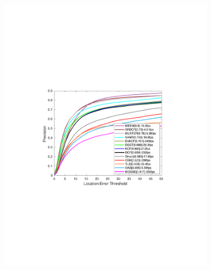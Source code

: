 \documentclass[10pt,twocolumn,letterpaper]{article}
\begin{document}
\begin{figure}
        \begin{subfigure}[b]{0.25\textwidth}
                \includegraphics[width=\linewidth]{./figures/Precision_OTB100.pdf}
        \end{subfigure}%
        \begin{subfigure}[b]{0.25\textwidth}

\end{subfigure}
\end{figure}
\end{document}
